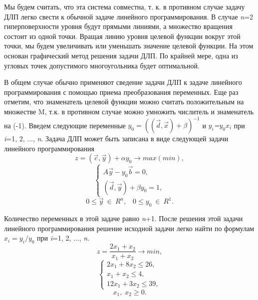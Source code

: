 {Мы будем считать, что эта система совместна, т. к. в противном случае задачу ДЛП легко свести к обычной задаче линейного программирования. В случае \textit{n}=2 гиперповерхности уровня будут прямыми линиями, а множество вращения состоит из одной точки. Вращая линию уровня целевой функции вокруг этой точки, мы будем увеличивать или уменьшать значение целевой функции. На этом основан графический метод решения задачи ДЛП. По крайней мере, одна из угловых точек допустимого многоугольника будет оптимальной.

В общем случае обычно применяют сведение задачи ДЛП к задаче линейного программирования с помощью приема преобразования переменных. Еще раз отметим, что знаменатель целевой функции можно считать положительным на множестве M, т.к. в противном случае можно умножить числитель и знаменатель на (-1). Введем следующие переменные \textit{$y_{0}=((\vec{d}, \vec{x})+\beta)^{-1}$} и \textit{$y_{i}$=$y_{0}x_{i}$} при \textit{i}=1, 2, ..., \textit{n}. Задача ДЛП может быть записана в виде следующей задачи линейного программирования
\begin{equation*}
z = (\vec{c}, \vec{y})+\alpha y_{0} \rightarrow max(min),
\end{equation*}
\begin{equation*}
\begin{cases}
A\vec{y}-y_{0}\vec{b}=0,
\\
(\vec{d}, \vec{y})+\beta y_{0}=1,
\end{cases}
\end{equation*}
\begin{equation*}
0\leq\vec{y}\:\in\: R^{n}, \;\;\; 0\leq y_{0}\:\in\: R^{1}.
\end{equation*}

Количество переменных в этой задаче равно \textit{n}+1. После решения этой задачи линейного программирования решение исходной задачи легко найти по формулам \textit{$x_{i}=y_{i}/y_{0}$} при \textit{i}=1, 2, ..., \textit{n}.
\\
\begin{equation*}
z = \frac{2x_{1}+x_{2}}{x_{1}+x_{2}}\rightarrow min,
\end{equation*}
\begin{equation*}
\begin{cases}
2x_{1}+8x_{2} \leq 26,
\\
x_{1}+x_{2} \leq 4,
\\
12x_{1}+3x_{2} \leq 39,
\end{cases}
\end{equation*}
\begin{equation*}
x_{1}, \;x_{2}\geq 0.
\end{equation*}

}
